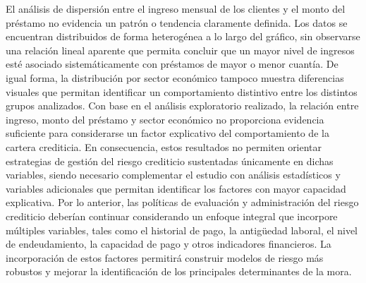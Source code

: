 El análisis de dispersión entre el ingreso mensual de los clientes y el monto del préstamo no evidencia un patrón o tendencia claramente definida. Los datos se encuentran distribuidos de forma heterogénea a lo largo del gráfico, sin observarse una relación lineal aparente que permita concluir que un mayor nivel de ingresos esté asociado sistemáticamente con préstamos de mayor o menor cuantía. De igual forma, la distribución por sector económico tampoco muestra diferencias visuales que permitan identificar un comportamiento distintivo entre los distintos grupos analizados.
Con base en el análisis exploratorio realizado, la relación entre ingreso, monto del préstamo y sector económico no proporciona evidencia suficiente para considerarse un factor explicativo del comportamiento de la cartera crediticia. En consecuencia, estos resultados no permiten orientar estrategias de gestión del riesgo crediticio sustentadas únicamente en dichas variables, siendo necesario complementar el estudio con análisis estadísticos y variables adicionales que permitan identificar los factores con mayor capacidad explicativa.
Por lo anterior, las políticas de evaluación y administración del riesgo crediticio deberían continuar considerando un enfoque integral que incorpore múltiples variables, tales como el historial de pago, la antigüedad laboral, el nivel de endeudamiento, la capacidad de pago y otros indicadores financieros. La incorporación de estos factores permitirá construir modelos de riesgo más robustos y mejorar la identificación de los principales determinantes de la mora.
